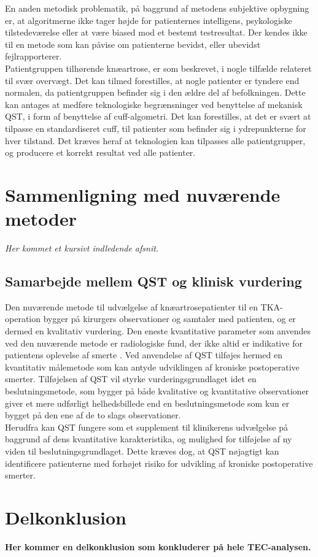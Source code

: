 En anden metodisk problematik, på baggrund af metodens subjektive opbygning er, at algoritmerne ikke tager højde for patienternes intelligens, psykologiske tilstedeværelse eller at være biased mod et bestemt testresultat. Der kendes ikke til en metode som kan påvise om patienterne bevidst, eller ubevidst fejlrapporterer. \citep{Dyck1998}  \\ 
Patientgruppen tilhørende knæartrose, er som beskrevet, i nogle tilfælde relateret til svær overvægt. Det kan tilmed forestilles, at nogle patienter er tyndere end normalen, da patientgruppen befinder sig i den ældre del af befolkningen. Dette kan antages at medføre teknologiske begrænsninger ved benyttelse af mekanisk QST, i form af benyttelse af cuff-algometri. Det kan forestilles, at det er svært at tilpasse en standardiseret cuff, til patienter som befinder sig i ydrepunkterne for hver tilstand. Det kræves heraf at teknologien kan tilpasses alle patientgrupper, og producere et korrekt resultat ved alle patienter. 

\section{Sammenligning med nuværende metoder}
\textit{Her kommet et kursivt indledende afsnit.}
\subsection{Samarbejde mellem QST og klinisk vurdering}
Den nuværende metode til udvælgelse af knæartrosepatienter til en TKA-operation bygger på kirurgers observationer og samtaler med patienten, og er dermed en kvalitativ vurdering. \citep{Troelsen2012} \citep{skou2016} Den eneste kvantitative parameter som anvendes ved den nuværende metode er radiologiske fund, der ikke altid er indikative for patientens oplevelse af smerte \citep{Leary2016}. Ved anvendelse af QST tilføjes hermed en kvantitativ målemetode som kan antyde udviklingen af kroniske postoperative smerter. Tilføjelsen af QST vil styrke vurderingsgrundlaget idet en beslutningsmetode, som bygger på både kvalitative og kvantitative observationer giver et mere udførligt helhedsbillede end en beslutningsmetode som kun er bygget på den ene af de to slags observationer. \citep{Gronmo2012} \\
Herudfra kan QST fungere som et supplement til klinikerens udvælgelse på baggrund af dens kvantitative karakteristika, og mulighed for tilføjelse af ny viden til beslutningsgrundlaget. Dette kræves dog, at QST nøjagtigt kan identificere patienterne med forhøjet risiko for udvikling af kroniske postoperative smerter.   

\section{Delkonklusion}
\textbf{Her kommer en delkonklusion som konkluderer på hele TEC-analysen.}

